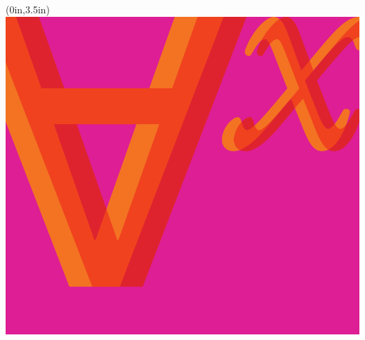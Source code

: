 
\thispagestyle{empty}

\begin{textblock*}{\stockwidth}(0in,3.5in)
  \noindent\includegraphics{../assets/forallx-coverart-screen.pdf}
\end{textblock*}

